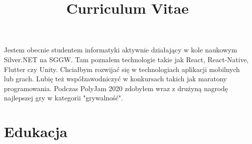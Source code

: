 \documentclass[11pt,a4paper,sans]{moderncv}        %
\title{Curriculum Vitae}                               %
\begin{document}
\makecvtitle

\section{}
Jestem obecnie studentem informatyki aktywnie działający w kole naukowym Silver.NET na SGGW. Tam
poznałem technologie takie jak React, React-Native, Flutter czy Unity. Chciałbym rozwijać się w technologiach
aplikacji mobilnych lub grach. Lubię też współzawodniczyć w konkursach takich jak maratony
programowania. Podczas PolyJam 2020 zdobyłem wraz z drużyną nagrodę najlepszej gry w kategorii
"grywalność".

\section{Edukacja}

\end{document}
